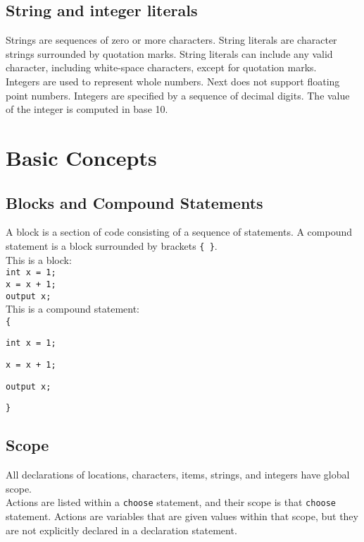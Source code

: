\documentclass[12pt]{article}
\begin{document}
\subsection{String and integer literals}
Strings are sequences of zero or more characters.  String literals are character strings surrounded by quotation marks.  String literals can include any valid character, including white-space characters, except for quotation marks. \\

\noindent Integers are used to represent whole numbers.  Next does not support floating point numbers.  Integers are specified by a sequence of decimal digits.  The value of the integer is computed in base 10.

\section{Basic Concepts}

\subsection{Blocks and Compound Statements}
A block is a section of code consisting of a sequence of statements.  A compound statement is a block surrounded by brackets \texttt{\{ \}}. \\

\noindent This is a block: \\

\texttt{int x = 1;} \\
\indent \texttt{x = x + 1;} \\
\indent \texttt{output x;} \\

\noindent This is a compound statement: \\

\texttt{\{}

\indent \indent \texttt{int x = 1;}

\indent \indent \texttt{x = x + 1;}

\indent \indent \texttt{output x;} 

\texttt{\}}

\subsection{Scope}
All declarations of locations, characters, items, strings, and integers have global scope.   \\

\noindent Actions are listed within a \texttt{choose} statement, and their scope is that \texttt{choose} statement.  Actions are variables that are given values within that scope, but they are not explicitly declared in a declaration statement.
\end{document}
